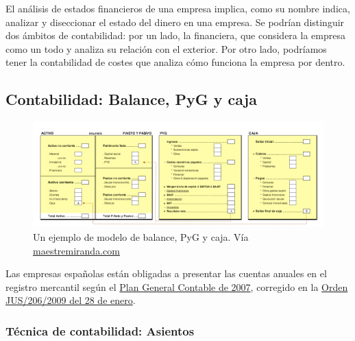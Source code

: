 \documentclass[nochap,palatino,shortheader]{apuntes}
\begin{document}
El análisis de estados financieros de una empresa implica, como su nombre indica, analizar y diseccionar el estado del dinero en una empresa. Se podrían distinguir dos ámbitos de contabilidad: por un lado, la financiera, que considera la empresa como un todo y analiza su relación con el exterior. Por otro lado, podríamos tener la contabilidad de costes que analiza cómo funciona la empresa por dentro.

\subsection{Contabilidad: Balance, PyG y caja}
\label{sec:Contabilidad}

\begin{figure}[hbtp]
\centering
\includegraphics[width=\textwidth]{img/Balance_PyG_Caja.png}
\caption{Un ejemplo de modelo de balance, PyG y caja. Vía \href{http://maestremiranda.com/techdir/wp-content/uploads/2015/10/EF0.-Bal_PYG_Caja.pdf}{maestremiranda.com}}
\label{fig:BalancePyGCaja}
\end{figure}

Las empresas españolas están obligadas a presentar las cuentas anuales en el registro mercantil según el \href{https://www.boe.es/buscar/doc.php?id=BOE-A-2007-13023}{Plan General Contable de 2007}, corregido en la \href{https://www.boe.es/boe/dias/2009/02/10/pdfs/BOE-A-2009-2276.pdf}{Orden JUS/206/2009 del 28 de enero}.

\subsubsection{Técnica de contabilidad: Asientos}
\end{document}
